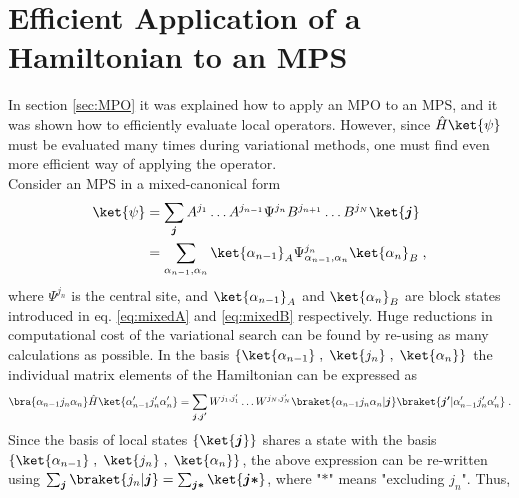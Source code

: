 \section{Efficient Application of a Hamiltonian to an MPS}
In section \ref{sec:MPO} it was explained how to apply an MPO to an MPS, and it was shown how to efficiently evaluate local operators. However, since $\hat{H} \ket{\psi}$ must be evaluated many times during variational methods, one must find even more efficient way of applying the operator.\\
Consider an MPS in a mixed-canonical form
\begin{align}
	\ket{\psi} &= \sum_{\boldsymbol{j}} A^{j_1} \ldots A^{j_{n-1}} \Psi^{j_n} B^{j_{n+1}} \ldots B^{j_{N}} \ket{\boldsymbol{j}} \nonumber \\
	&= \sum_{\alpha_{n-1} , \alpha_{n}} \ket{\alpha_{n-1}}_A \Psi_{\alpha_{n-1} , \alpha_{n}}^{j_n}  \ket{\alpha_{n}}_B \; ,
	\label{eq:MPSmixedsingle}
\end{align}
where $\Psi^{j_n}$ is the central site, and $\ket{\alpha_{n-1}}_A$ and $\ket{\alpha_{n}}_B$ are block states introduced in eq. \eqref{eq:mixedA} and \eqref{eq:mixedB} respectively.
Huge reductions in computational cost of the variational search can be found by re-using as many calculations as possible. In the basis $\{ \ket{\alpha_{n-1} } \; , \; \ket{ j_n } \; , \; \ket{\alpha_{n} } \}$ the individual matrix elements of the Hamiltonian can be expressed as
\begin{equation*}
	\bra{\alpha_{n-1} j_n \alpha_{n}} \hat{H} \ket{\alpha_{n-1} ' j_n ' \alpha_{n} '} = \sum_{\boldsymbol{j} , \boldsymbol{j'}}  W^{j_1 , j_1 '} \ldots W^{j_N , j_N '}  \braket{\alpha_{n-1} j_n \alpha_{n} | \boldsymbol{j}} \braket{\boldsymbol{j'} | \alpha_{n-1} ' j_n ' \alpha_{n} '} \; . 
\end{equation*}
Since the basis of local states $\{ \ket{\boldsymbol{j}} \}$ shares a state with the basis $\{ \ket{\alpha_{n-1} } \; , \; \ket{ j_n } \; , \; \ket{\alpha_{n} } \}$, the above expression can be re-written using $\sum_{\boldsymbol{j}} \braket{j_n | \boldsymbol{j}} = \sum_{\boldsymbol{j *}} \ket{ \boldsymbol{j *}}$, where "$\boldsymbol{*}$" means "excluding $j_n$". Thus,
